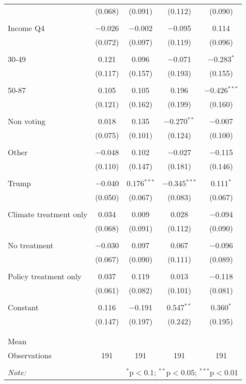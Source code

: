 \begin{tabular}{@{\extracolsep{5pt}}lcccc}
  & (0.068) & (0.091) & (0.112) & (0.090) \\ 
  & & & & \\ 
 Income Q4 & $-$0.026 & $-$0.002 & $-$0.095 & 0.114 \\ 
  & (0.072) & (0.097) & (0.119) & (0.096) \\ 
  & & & & \\ 
 30-49 & 0.121 & 0.096 & $-$0.071 & $-$0.283$^{*}$ \\ 
  & (0.117) & (0.157) & (0.193) & (0.155) \\ 
  & & & & \\ 
 50-87 & 0.105 & 0.105 & 0.196 & $-$0.426$^{***}$ \\ 
  & (0.121) & (0.162) & (0.199) & (0.160) \\ 
  & & & & \\ 
 Non voting & 0.018 & 0.135 & $-$0.270$^{**}$ & $-$0.007 \\ 
  & (0.075) & (0.101) & (0.124) & (0.100) \\ 
  & & & & \\ 
 Other & $-$0.048 & 0.102 & $-$0.027 & $-$0.115 \\ 
  & (0.110) & (0.147) & (0.181) & (0.146) \\ 
  & & & & \\ 
 Trump & $-$0.040 & 0.176$^{***}$ & $-$0.345$^{***}$ & 0.111$^{*}$ \\ 
  & (0.050) & (0.067) & (0.083) & (0.067) \\ 
  & & & & \\ 
 Climate treatment only & 0.034 & 0.009 & 0.028 & $-$0.094 \\ 
  & (0.068) & (0.091) & (0.112) & (0.090) \\ 
  & & & & \\ 
 No treatment & $-$0.030 & 0.097 & 0.067 & $-$0.096 \\ 
  & (0.067) & (0.090) & (0.111) & (0.089) \\ 
  & & & & \\ 
 Policy treatment only & 0.037 & 0.119 & 0.013 & $-$0.118 \\ 
  & (0.061) & (0.082) & (0.101) & (0.081) \\ 
  & & & & \\ 
 Constant & 0.116 & $-$0.191 & 0.547$^{**}$ & 0.360$^{*}$ \\ 
  & (0.147) & (0.197) & (0.242) & (0.195) \\ 
  & & & & \\ 
\hline \\[-1.8ex] 
Mean &  &  &  &  \\ 
Observations & 191 & 191 & 191 & 191 \\ 
\hline 
\hline \\[-1.8ex] 
\textit{Note:}  & \multicolumn{4}{r}{$^{*}$p$<$0.1; $^{**}$p$<$0.05; $^{***}$p$<$0.01} \\ 
\end{tabular} 
